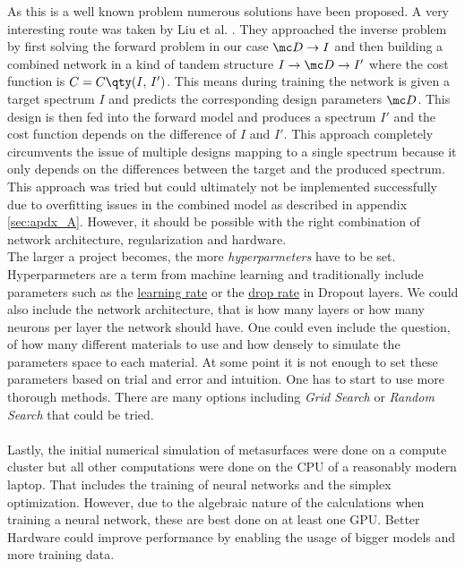 \indent
As this is a well known problem numerous solutions have been proposed. A very interesting route was taken by Liu et al. \cite{Liu2018}. They approached the inverse problem by first solving the forward problem in our case $\mc D \rightarrow I$ and then building a combined network in a kind of tandem structure 
$I \rightarrow \mc D \rightarrow I'$
where the cost function is 
$C = C \qty(I, \, I')$.
This means during training the network is given a target spectrum $I$ and predicts the corresponding design parameters $\mc D$. This design is then fed into the forward model and produces a spectrum $I'$ and the cost function depends on the difference of $I$ and $I'$. This approach completely circumvents the issue of multiple designs mapping to a single spectrum because it only depends on the differences between the target and the produced spectrum. This approach was tried but could ultimately not be implemented successfully due to overfitting issues in the combined model as described in appendix \ref{sec:apdx_A}. However, it should be possible with the right combination of network architecture, regularization and hardware.
\\    

\indent
The larger a project becomes, the more \textit{hyperparmeters} have to be set. Hyperparmeters are a term from machine learning and traditionally include parameters such as the \hyperref[hyp:learnigrate]{learning rate} or the \hyperref[hyp:dropout]{drop rate} in Dropout layers. We could also include the network architecture, that is how many layers or how many neurons per layer the network should have. One could even include the question, of how many different materials to use and how densely to simulate the parameters space to each material.
At some point it is not enough to set these parameters based on trial and error and intuition. One has to start to use more thorough methods. There are many options including \textit{Grid Search} or \textit{Random Search} \cite{RandomSearch} that could be tried.
\\
\\

\indent
Lastly, the initial numerical simulation of metasurfaces were done on a compute cluster but all other computations were done on the CPU of a reasonably modern laptop. That includes the training of neural networks and the simplex optimization. However, due to the algebraic nature of the calculations when training a neural network, these are best done on at least one GPU. Better Hardware could improve performance by enabling the usage of bigger models and more training data. 


